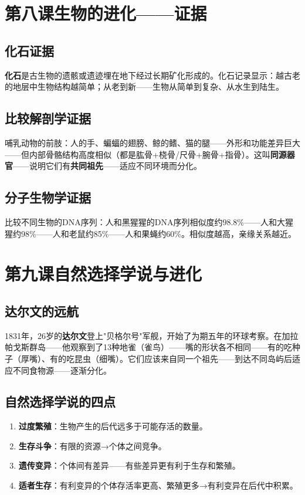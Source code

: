 \documentclass[a4paper,12pt]{ctexart}
\begin{document}
\newpage
\section{\textcolor{orange!80!black}{第八课\quad 生物的进化——证据}}

\subsection*{化石证据}
\textbf{化石}是古生物的遗骸或遗迹埋在地下经过长期矿化形成的。化石记录显示：越古老的地层中生物结构越简单；从老到新——生物从简单到复杂、从水生到陆生。

\subsection*{比较解剖学证据}
哺乳动物的前肢：人的手、蝙蝠的翅膀、鲸的鳍、猫的腿——外形和功能差异巨大——但内部骨骼结构高度相似（都是肱骨+桡骨/尺骨+腕骨+指骨）。这叫\textbf{同源器官}——说明它们有\textbf{共同祖先}——适应不同环境而分化。

\subsection*{分子生物学证据}
比较不同生物的DNA序列：人和黑猩猩的DNA序列相似度约98.8\%——人和大猩猩约98\%——人和老鼠约85\%——人和果蝇约60\%。相似度越高，亲缘关系越近。

\newpage
\section{\textcolor{orange!80!black}{第九课\quad 自然选择学说与进化}}

\subsection*{达尔文的远航}
1831年，26岁的\textbf{达尔文}登上"贝格尔号"军舰，开始了为期五年的环球考察。在加拉帕戈斯群岛——他观察到了13种地雀（雀鸟）——嘴的形状各不相同——有的吃种子（厚嘴）、有的吃昆虫（细嘴）。它们应该来自同一个祖先——到达不同岛屿后适应不同食物源——逐渐分化。

\subsection*{自然选择学说的四点}
\begin{enumerate}
  \item \textbf{过度繁殖}：生物产生的后代远多于可能存活的数量。
  \item \textbf{生存斗争}：有限的资源→个体之间竞争。
  \item \textbf{遗传变异}：个体间有差异——有些差异更有利于生存和繁殖。
  \item \textbf{适者生存}：有利变异的个体存活率更高、繁殖更多→有利变异在后代中积累。
\end{enumerate}
\end{document}
